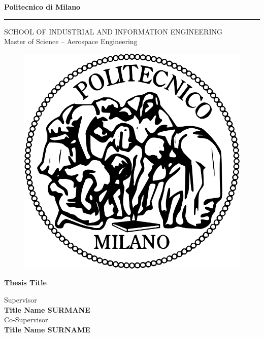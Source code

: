 \documentclass[a4paper,12pt,openright,notitlepage,twoside]{book}
\begin{document}
\frontmatter %
\thispagestyle{empty} %

\begin{center}
\Large{\textbf{Politecnico di Milano}} \\
\vspace{-4mm}
\rule{\textwidth}{0.4pt}
\normalsize{SCHOOL OF INDUSTRIAL AND INFORMATION ENGINEERING} \\
\normalsize{Master of Science -- Aerospace Engineering} \\
\vspace{20mm}
\begin{figure}[h!]
\centering
\includegraphics[height=0.15\textheight]{images/logo-polimi}
\end{figure}
\vspace{22mm}
\huge{\textbf{Thesis Title}} \\
\vspace{32mm}
\end{center}

\begin{flushleft}
\normalsize{Supervisor} \\
\small{\textbf{Title Name SURMANE}} \\
\vspace{5mm}
\normalsize{Co-Supervisor} \\
\small{\textbf{Title Name SURNAME}} \\
\end{flushleft}
\vspace{20mm}
\end{document}
